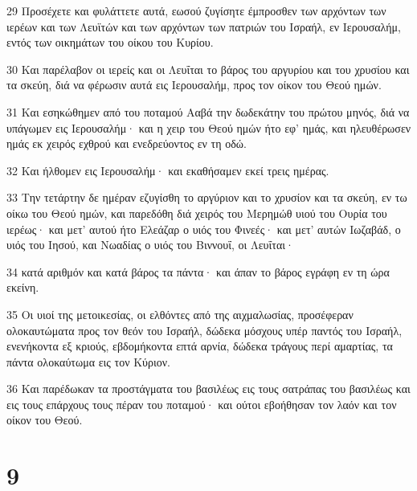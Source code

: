 \par 29 Προσέχετε και φυλάττετε αυτά, εωσού ζυγίσητε έμπροσθεν των αρχόντων των ιερέων και των Λευϊτών και των αρχόντων των πατριών του Ισραήλ, εν Ιερουσαλήμ, εντός των οικημάτων του οίκου του Κυρίου.
\par 30 Και παρέλαβον οι ιερείς και οι Λευΐται το βάρος του αργυρίου και του χρυσίου και τα σκεύη, διά να φέρωσιν αυτά εις Ιερουσαλήμ, προς τον οίκον του Θεού ημών.
\par 31 Και εσηκώθημεν από του ποταμού Ααβά την δωδεκάτην του πρώτου μηνός, διά να υπάγωμεν εις Ιερουσαλήμ· και η χειρ του Θεού ημών ήτο εφ' ημάς, και ηλευθέρωσεν ημάς εκ χειρός εχθρού και ενεδρεύοντος εν τη οδώ.
\par 32 Και ήλθομεν εις Ιερουσαλήμ· και εκαθήσαμεν εκεί τρεις ημέρας.
\par 33 Την τετάρτην δε ημέραν εζυγίσθη το αργύριον και το χρυσίον και τα σκεύη, εν τω οίκω του Θεού ημών, και παρεδόθη διά χειρός του Μερημώθ υιού του Ουρία του ιερέως· και μετ' αυτού ήτο Ελεάζαρ ο υιός του Φινεές· και μετ' αυτών Ιωζαβάδ, ο υιός του Ιησού, και Νωαδίας ο υιός του Βιννουΐ, οι Λευΐται·
\par 34 κατά αριθμόν και κατά βάρος τα πάντα· και άπαν το βάρος εγράφη εν τη ώρα εκείνη.
\par 35 Οι υιοί της μετοικεσίας, οι ελθόντες από της αιχμαλωσίας, προσέφεραν ολοκαυτώματα προς τον θεόν του Ισραήλ, δώδεκα μόσχους υπέρ παντός του Ισραήλ, ενενήκοντα εξ κριούς, εβδομήκοντα επτά αρνία, δώδεκα τράγους περί αμαρτίας, τα πάντα ολοκαύτωμα εις τον Κύριον.
\par 36 Και παρέδωκαν τα προστάγματα του βασιλέως εις τους σατράπας του βασιλέως και εις τους επάρχους τους πέραν του ποταμού· και ούτοι εβοήθησαν τον λαόν και τον οίκον του Θεού.

\chapter{9}

